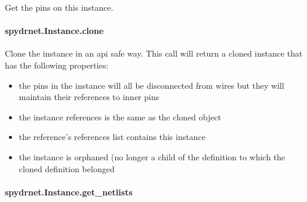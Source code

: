 \documentclass[letterpaper,10pt,english,openany,oneside]{sphinxmanual}
\begin{document}
\begin{fulllineitems}
\label{\detokenize{reference/classes/generated/spydrnet.Instance.pins:spydrnet.Instance.pins}}
Get the pins on this instance.

\end{fulllineitems}



\paragraph{spydrnet.Instance.clone}
\label{\detokenize{reference/classes/generated/spydrnet.Instance.clone:spydrnet-instance-clone}}\label{\detokenize{reference/classes/generated/spydrnet.Instance.clone::doc}}

\begin{fulllineitems}
\label{\detokenize{reference/classes/generated/spydrnet.Instance.clone:spydrnet.Instance.clone}}
Clone the instance in an api safe way.
This call will return a cloned instance that has the following properties:
\begin{itemize}
\item {} 
the pins in the instance will all be disconnected from wires but they will maintain their references to inner pins

\item {} 
the instance references is the same as the cloned object

\item {} 
the reference’s references list contains this instance

\item {} 
the instance is orphaned (no longer a child of the definition to which the cloned definition belonged

\end{itemize}

\end{fulllineitems}



\paragraph{spydrnet.Instance.get\_netlists}
\label{\detokenize{reference/classes/generated/spydrnet.Instance.get_netlists:spydrnet-instance-get-netlists}}\label{\detokenize{reference/classes/generated/spydrnet.Instance.get_netlists::doc}}
\end{document}
